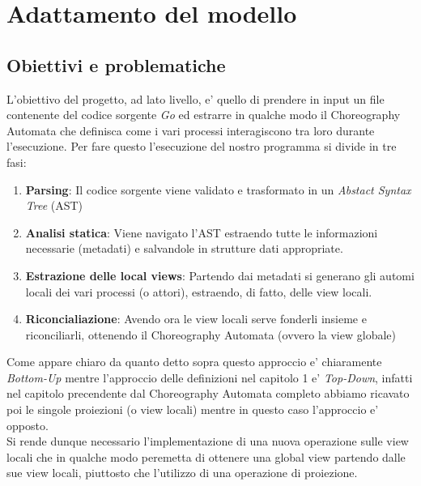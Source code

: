 \chapter{Adattamento del modello}
\section{Obiettivi e problematiche}
L'obiettivo del progetto, ad lato livello, e' quello di prendere in input un file contenente del codice sorgente \emph{Go} ed estrarre in qualche modo il Choreography Automata che definisca come i vari processi interagiscono tra loro durante l'esecuzione.
Per fare questo l'esecuzione del nostro programma si divide in tre fasi:
\begin{enumerate}
    \item \textbf{Parsing}: Il codice sorgente viene validato e trasformato in un \emph{Abstact Syntax Tree} (AST)
    \item \textbf{Analisi statica}: Viene navigato l'AST estraendo tutte le informazioni necessarie (metadati) e salvandole in strutture dati appropriate.
    \item \textbf{Estrazione delle local views}: Partendo dai metadati si generano gli automi locali dei vari processi (o attori), estraendo, di fatto, delle view locali.
    \item \textbf{Riconcialiazione}: Avendo ora le view locali serve fonderli insieme e riconciliarli, ottenendo il Choreography Automata (ovvero la view globale)
\end{enumerate}
Come appare chiaro da quanto detto sopra questo approccio e' chiaramente \emph{Bottom-Up} mentre l'approccio delle definizioni nel capitolo 1 e' \emph{Top-Down}, infatti nel capitolo precendente dal Choreography Automata completo abbiamo ricavato poi le singole proiezioni (o view locali) mentre in questo caso l'approccio e' opposto.\\
Si rende dunque necessario l'implementazione di una nuova operazione sulle view locali che in qualche modo peremetta di ottenere una global view partendo dalle sue view locali, piuttosto che l'utilizzo di una operazione di proiezione.


